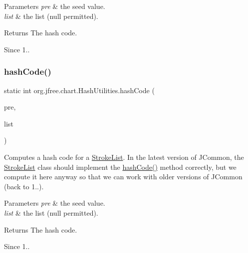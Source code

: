 \begin{DoxyParams}{Parameters}
{\em pre} & the seed value. \\
\hline
{\em list} & the list ({\ttfamily null} permitted).\\
\hline
\end{DoxyParams}
\begin{DoxyReturn}{Returns}
The hash code.
\end{DoxyReturn}
\begin{DoxySince}{Since}
1.. 
\end{DoxySince}
\mbox{\label{classorg_1_1jfree_1_1chart_1_1_hash_utilities_a18afb776adb8fcb7ea69dc23a8aff1e4}} 
\subsubsection{\texorpdfstring{hash\+Code()}{hashCode()}\hspace{0.1cm}{\footnotesize\ttfamily [11/11]}}
{\footnotesize\ttfamily static int org.\+jfree.\+chart.\+Hash\+Utilities.\+hash\+Code (\begin{DoxyParamCaption}\item[{int}]{pre,  }\item[{Stroke\+List}]{list }\end{DoxyParamCaption})\hspace{0.3cm}{\ttfamily [static]}}

Computes a hash code for a \mbox{\hyperlink{}{Stroke\+List}}. In the latest version of J\+Common, the \mbox{\hyperlink{}{Stroke\+List}} class should implement the \mbox{\hyperlink{classorg_1_1jfree_1_1chart_1_1_hash_utilities_aa24ce901adc9ad33cd04567ea5ffe5a5}{hash\+Code()}} method correctly, but we compute it here anyway so that we can work with older versions of J\+Common (back to 1..).


\begin{DoxyParams}{Parameters}
{\em pre} & the seed value. \\
\hline
{\em list} & the list ({\ttfamily null} permitted).\\
\hline
\end{DoxyParams}
\begin{DoxyReturn}{Returns}
The hash code.
\end{DoxyReturn}
\begin{DoxySince}{Since}
1.. 
\end{DoxySince}
\mbox{\label{classorg_1_1jfree_1_1chart_1_1_hash_utilities_ad2742a30adc83df83b996f887b9bf7a3}} 
